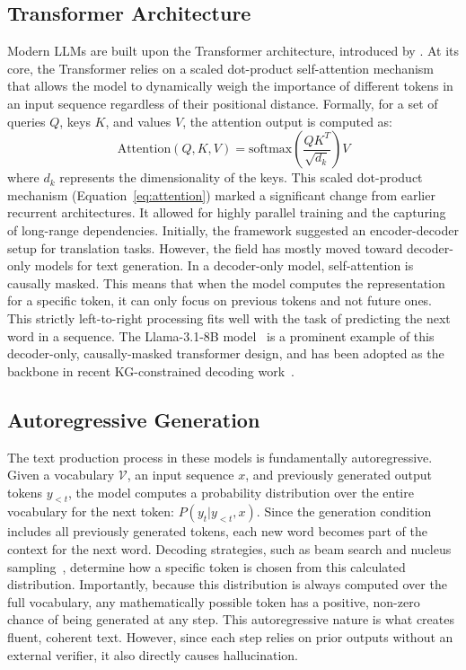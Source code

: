 \subsection{Transformer Architecture}

Modern LLMs are built upon the Transformer architecture, introduced by \citet{vaswani2017attention}. At its core, the Transformer relies on a scaled dot-product self-attention mechanism that allows the model to dynamically weigh the importance of different tokens in an input sequence regardless of their positional distance. Formally, for a set of queries $Q$, keys $K$, and values $V$, the attention output is computed as:
\begin{equation}
  \text{Attention}(Q, K, V) = \text{softmax}\left(\frac{QK^T}{\sqrt{d_k}}\right)V
  \label{eq:attention}
\end{equation}
where $d_k$ represents the dimensionality of the keys. This scaled dot-product mechanism (Equation~\ref{eq:attention}) marked a significant change from earlier recurrent architectures. It allowed for highly parallel training and the capturing of long-range dependencies. Initially, the framework suggested an encoder-decoder setup for translation tasks. However, the field has mostly moved toward decoder-only models for text generation. In a decoder-only model, self-attention is causally masked. This means that when the model computes the representation for a specific token, it can only focus on previous tokens and not future ones. This strictly left-to-right processing fits well with the task of predicting the next word in a sequence. The Llama-3.1-8B model~\citep{dubey2024llama3} is a prominent example of this decoder-only, causally-masked transformer design, and has been adopted as the backbone in recent KG-constrained decoding work~\citep{luo2025-graph-constrained-reasoning}.

\subsection{Autoregressive Generation}

The text production process in these models is fundamentally autoregressive. Given a vocabulary $\mathcal{V}$, an input sequence $x$, and previously generated output tokens $y_{<t}$, the model computes a probability distribution over the entire vocabulary for the next token: $P(y_t | y_{<t}, x)$. Since the generation condition includes all previously generated tokens, each new word becomes part of the context for the next word. Decoding strategies, such as beam search and nucleus sampling~\citep{holtzman2020curious}, determine how a specific token is chosen from this calculated distribution. Importantly, because this distribution is always computed over the full vocabulary, any mathematically possible token has a positive, non-zero chance of being generated at any step. This autoregressive nature is what creates fluent, coherent text. However, since each step relies on prior outputs without an external verifier, it also directly causes hallucination.



